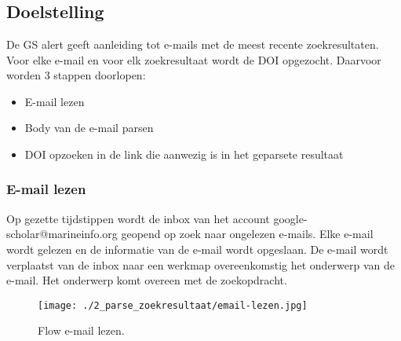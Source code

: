 
\chapter{}%
\label{ch:parsezoekresultaat}

\section{Doelstelling}
De GS alert geeft aanleiding tot e-mails met de meest recente zoekresultaten. Voor elke e-mail en voor elk zoekresultaat wordt de DOI opgezocht. Daarvoor worden 3 stappen doorlopen:
\begin{itemize}
    \item E-mail lezen
    \item Body van de e-mail parsen
    \item DOI opzoeken in de link die aanwezig is in het geparsete resultaat
\end{itemize}
\subsection{E-mail lezen}
Op gezette tijdstippen wordt de inbox van het account google-scholar@marineinfo.org geopend op zoek naar ongelezen e-mails. Elke e-mail wordt gelezen en de informatie van de e-mail wordt opgeslaan. De e-mail wordt verplaatst van de inbox naar een werkmap overeenkomstig het onderwerp van de e-mail. Het onderwerp komt overeen met de zoekopdracht.
\begin{figure}[h!]
    \centering
    \texttt{[image: ./2\_parse\_zoekresultaat/email-lezen.jpg]}
    \caption[E-mail lezen.]{\label{fig:E-mail lezen}Flow e-mail lezen.}
\end{figure}
